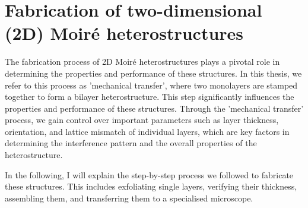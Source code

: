 \section{Fabrication of two-dimensional (2D) Moiré heterostructures}
\label{sec:fab_method}
%


The fabrication process of 2D Moir\'e heterostructures plays a pivotal role in determining the properties and performance of these structures. In this thesis, we refer to this process as 'mechanical transfer', where two monolayers are stamped together to form a bilayer heterostructure. This step significantly influences the properties and performance of these structures. 
%
Through the 'mechanical transfer' process, we gain control over important parameters such as layer thickness, orientation, and lattice mismatch of individual layers, which are key factors in determining the interference pattern and the overall properties of the heterostructure.

In the following, I will explain the step-by-step process we followed to fabricate these structures. This includes exfoliating single layers, verifying their thickness, assembling them, and transferring them to a specialised microscope.



